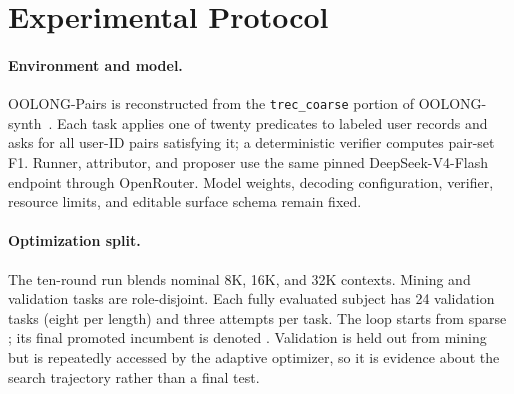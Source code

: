 \section{Experimental Protocol}
\label{sec:setup}

\paragraph{Environment and model.}
OOLONG-Pairs is reconstructed from the \texttt{trec\_coarse} portion of
OOLONG-synth~\citep{bertsch2025oolong}. Each task applies one of twenty
predicates to labeled user records and asks for all user-ID pairs satisfying
it; a deterministic verifier computes pair-set F1. Runner, attributor, and
proposer use the same pinned DeepSeek-V4-Flash endpoint through OpenRouter.
Model weights, decoding configuration, verifier, resource limits, and editable
surface schema remain fixed.

\paragraph{Optimization split.}
The ten-round run blends nominal 8K, 16K, and 32K contexts. Mining and
validation tasks are role-disjoint. Each fully evaluated subject has 24
validation tasks (eight per length) and three attempts per task. The loop starts
from sparse \hzero{}; its final promoted incumbent is denoted \shrlm. Validation
is held out from mining but is repeatedly accessed by the adaptive optimizer,
so it is evidence about the search trajectory rather than a final test.

